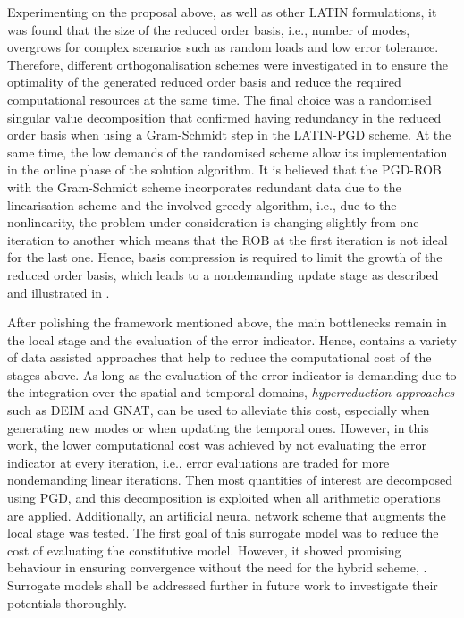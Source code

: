 Experimenting on the proposal above, as well as other LATIN formulations, it was found that the size of the reduced order basis, i.e., number of modes, overgrows for complex scenarios such as random loads and low error tolerance. Therefore, different orthogonalisation schemes were investigated in  to ensure the optimality of the generated reduced order basis and reduce the required computational resources at the same time. The final choice was a randomised singular value decomposition that confirmed having redundancy in the reduced order basis when using a Gram-Schmidt step in the LATIN-PGD scheme. At the same time, the low demands of the randomised scheme allow its implementation in the online phase of the solution algorithm. It is believed that the PGD-ROB with the Gram-Schmidt scheme incorporates redundant data due to the linearisation scheme and the involved greedy algorithm, i.e., due to the nonlinearity, the problem under consideration is changing slightly from one iteration to another which means that the ROB at the first iteration is not ideal for the last one. Hence, basis compression is required to limit the growth of the reduced order basis, which leads to a nondemanding update stage as described and illustrated in .

After polishing the framework mentioned above, the main bottlenecks remain in the local stage and the evaluation of the error indicator. Hence,  contains a variety of data assisted approaches that help to reduce the computational cost of the stages above. As long as the evaluation of the error indicator is demanding due to the integration over the spatial and temporal domains, \emph{hyperreduction approaches} such as DEIM and GNAT, can be used to alleviate this cost, especially when generating new modes or when updating the temporal ones. However, in this work, the lower computational cost was achieved by not evaluating the error indicator at every iteration, i.e., error evaluations are traded for more nondemanding linear iterations. Then most quantities of interest are decomposed using PGD, and this decomposition is exploited when all arithmetic operations are applied. Additionally, an artificial neural network scheme that augments the local stage was tested. The first goal of this surrogate model was to reduce the cost of evaluating the constitutive model. However, it showed promising behaviour in ensuring convergence without the need for the hybrid scheme, . Surrogate models shall be addressed further in future work to investigate their potentials thoroughly.

